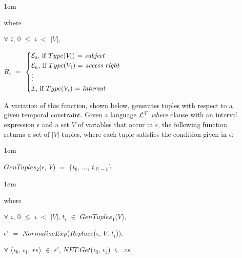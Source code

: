 \documentclass[11pt]{report}
\newenvironment{vquote}
{
  \begin{list}{}{\leftmargin 1em}\item[]
}
{
  \end{list}
}
\begin{document}
            \begin{vquote}
              where

              \hspace{1em}
              $\forall$ $i$, $0$ $\leq$ $i$ $<$ $|V|$,

              \hspace{1em}
              $R_i$ $=$
              \begin{math}
                \begin{cases}
                  \mbox{${\cal E}_s$, if $Type$($V_i$) $=$ {\em subject}} \\
                  \mbox{${\cal E}_a$, if $Type$($V_i$) $=$ {\em access right}} \\
                  \vdots \\
                  \mbox{${\cal I}$, if $Type$($V_i$) $=$ {\em interval}}
                \end{cases}
              \end{math}
            \end{vquote}

            A variation of this function, shown below, generates tuples
            with respect to a given temporal constraint. Given a language
            ${\cal L^T}$ {\em where} clause with an interval expression
            $\epsilon$ and a set $V$ of variables that occur in
            $\epsilon$, the following function returns a set of
            $|V|$-tuples, where each tuple satisfies the condition given
            in $\epsilon$:

            \begin{vquote}
              $GenTuples_2$($\epsilon$, $V$)
              $=$ \{$t_0$, $\ldots$, $t_{|V|-1}$\}
            \end{vquote}

            \begin{vquote}
              where

              \hspace{1em}
              $\forall$ $i$, $0$ $\leq$ $i$ $<$ $|V|$,
              $t_i$ $\in$ $GenTuples_1$($V$),

              \hspace{1em}
              $\epsilon'$ $=$
              $NormaliseExp$($Replace$($\epsilon$, $V$, $t_i$)),

              \hspace{1em}
              $\forall$ (${\iota}_0$, ${\iota}_1$, $rs$) $\in$
              $\epsilon'$,
              $NET.Get$(${\iota}_0$, ${\iota}_1$) $\subseteq$ $rs$
            \end{vquote}
\end{document}
